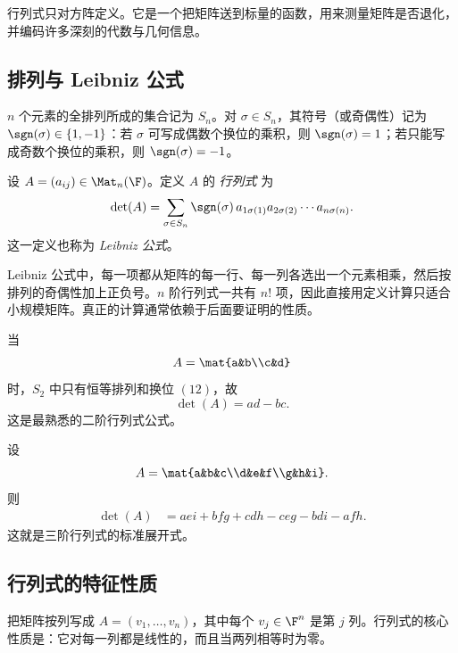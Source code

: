 行列式只对方阵定义。它是一个把矩阵送到标量的函数，用来测量矩阵是否退化，并编码许多深刻的代数与几何信息。

\subsection{排列与 Leibniz 公式}

\begin{definition}
$n$ 个元素的全排列所成的集合记为 $S_n$。对 $\sigma\in S_n$，其符号（或奇偶性）记为 $\sgn(\sigma)\in\{1,-1\}$：若 $\sigma$ 可写成偶数个换位的乘积，则 $\sgn(\sigma)=1$；若只能写成奇数个换位的乘积，则 $\sgn(\sigma)=-1$。
\end{definition}

\begin{definition}[行列式]
设 $A=(a_{ij})\in\Mat_n(\F)$。定义 $A$ 的 \emph{行列式} 为
\[
\det(A)=\sum_{\sigma\in S_n}\sgn(\sigma)\,a_{1\sigma(1)}a_{2\sigma(2)}\cdots a_{n\sigma(n)}.
\]
这一定义也称为 \emph{Leibniz 公式}。
\end{definition}

\begin{remark}
Leibniz 公式中，每一项都从矩阵的每一行、每一列各选出一个元素相乘，然后按排列的奇偶性加上正负号。$n$ 阶行列式一共有 $n!$ 项，因此直接用定义计算只适合小规模矩阵。真正的计算通常依赖于后面要证明的性质。
\end{remark}

\begin{example}
当
\[
A=\mat{a&b\\c&d}
\]
时，$S_2$ 中只有恒等排列和换位 $(12)$，故
\[
\det(A)=ad-bc.
\]
这是最熟悉的二阶行列式公式。
\end{example}

\begin{example}
设
\[
A=\mat{a&b&c\\d&e&f\\g&h&i}.
\]
则
\begin{align*}
\det(A)
&=aei+bfg+cdh-ceg-bdi-afh.
\end{align*}
这就是三阶行列式的标准展开式。
\end{example}

\subsection{行列式的特征性质}

把矩阵按列写成 $A=(v_1,\dots,v_n)$，其中每个 $v_j\in\F^n$ 是第 $j$ 列。行列式的核心性质是：它对每一列都是线性的，而且当两列相等时为零。

